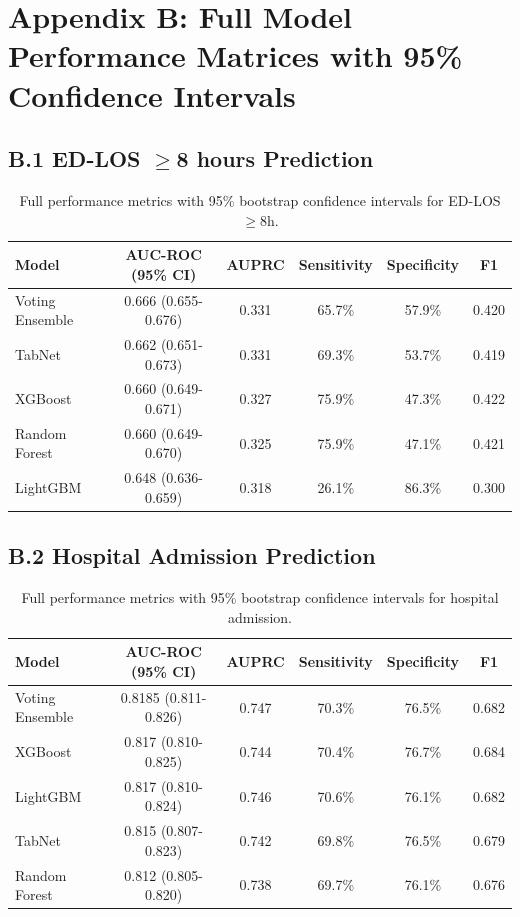 \documentclass[11pt]{article}
\begin{document}
\section{Appendix B: Full Model Performance Matrices with 95\% Confidence Intervals}

\subsection{B.1 ED-LOS $\ge$8 hours Prediction}

\begin{table}[H]
\centering
\caption{Full performance metrics with 95\% bootstrap confidence intervals for ED-LOS $\ge$8h.}
\begin{tabular}{@{}lccccc@{}}
\toprule
\textbf{Model} & \textbf{AUC-ROC (95\% CI)} & \textbf{AUPRC} & \textbf{Sensitivity} & \textbf{Specificity} & \textbf{F1} \\
\midrule
Voting Ensemble & 0.666 (0.655-0.676) & 0.331 & 65.7\% & 57.9\% & 0.420 \\
TabNet & 0.662 (0.651-0.673) & 0.331 & 69.3\% & 53.7\% & 0.419 \\
XGBoost & 0.660 (0.649-0.671) & 0.327 & 75.9\% & 47.3\% & 0.422 \\
Random Forest & 0.660 (0.649-0.670) & 0.325 & 75.9\% & 47.1\% & 0.421 \\
LightGBM & 0.648 (0.636-0.659) & 0.318 & 26.1\% & 86.3\% & 0.300 \\
\bottomrule
\end{tabular}
\end{table}

\subsection{B.2 Hospital Admission Prediction}

\begin{table}[H]
\centering
\caption{Full performance metrics with 95\% bootstrap confidence intervals for hospital admission.}
\begin{tabular}{@{}lccccc@{}}
\toprule
\textbf{Model} & \textbf{AUC-ROC (95\% CI)} & \textbf{AUPRC} & \textbf{Sensitivity} & \textbf{Specificity} & \textbf{F1} \\
\midrule
Voting Ensemble & 0.8185 (0.811-0.826) & 0.747 & 70.3\% & 76.5\% & 0.682 \\
XGBoost & 0.817 (0.810-0.825) & 0.744 & 70.4\% & 76.7\% & 0.684 \\
LightGBM & 0.817 (0.810-0.824) & 0.746 & 70.6\% & 76.1\% & 0.682 \\
TabNet & 0.815 (0.807-0.823) & 0.742 & 69.8\% & 76.5\% & 0.679 \\
Random Forest & 0.812 (0.805-0.820) & 0.738 & 69.7\% & 76.1\% & 0.676 \\
\bottomrule
\end{tabular}
\end{table}
\end{document}

